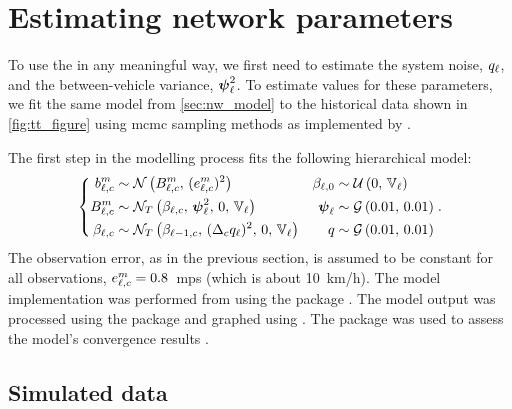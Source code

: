 
\section{Estimating network parameters}
\label{sec:nw_par_est}


To use the \kf{} in any meaningful way, we first need to estimate the system noise, $q_\ell$, and the between-vehicle variance, $\mathbf{\boldsymbol{\psi}}_{\ell}^2$. To estimate values for these parameters, we fit the same model from \cref{sec:nw_model} to the historical data shown in \cref{fig:tt_figure} using \gls{mcmc} sampling methods as implemented by  \citep{JAGS}.


The first step in the modelling process fits the following hierarchical model:
\begin{equation}
\label{eq:nw_model_simple}
\left\{
\begin{split}
b_{\ell,c}^m &\sim \mathcal{N}\left(B_{\ell,c}^m,\, (e_{\ell,c}^m)^2\right) &
\beta_{\ell,0} &\sim \mathcal{U}\left(0,\, \mathbb{V}_\ell\right) \nonumber \\
B_{\ell,c}^m &\sim \mathcal{N}_T\left(\beta_{\ell,c},\, \mathbf{\boldsymbol{\psi}}_{\ell}^2,\, 0,\, \mathbb{V}_\ell\right) &
\mathbf{\boldsymbol{\psi}}_\ell &\sim \mathcal{G}\left(0.01,\, 0.01\right) \\
\beta_{\ell,c} &\sim \mathcal{N}_T\left(\beta_{\ell-1,c},\, (\Delta_c q_{\ell})^2,\, 0,\, \mathbb{V}_\ell\right) &
q &\sim \mathcal{G}\left(0.01,\, 0.01\right) \nonumber
\end{split}
\right. .
\end{equation}
The observation error, as in the previous section, is assumed to be constant for all observations, $e_{\ell,c}^m = 0.8$~\gls{mps} (which is about 10~km/h). The model implementation was performed from \Rstats{} using the  package \citep{rjags}. The model output was processed using the  package \citep{tidybayes} and graphed using  \citep{ggplot2}. The  package was used to assess the model's convergence results \citep{coda}.


\subsection{Simulated data}
\label{nw_par_est_sim}

